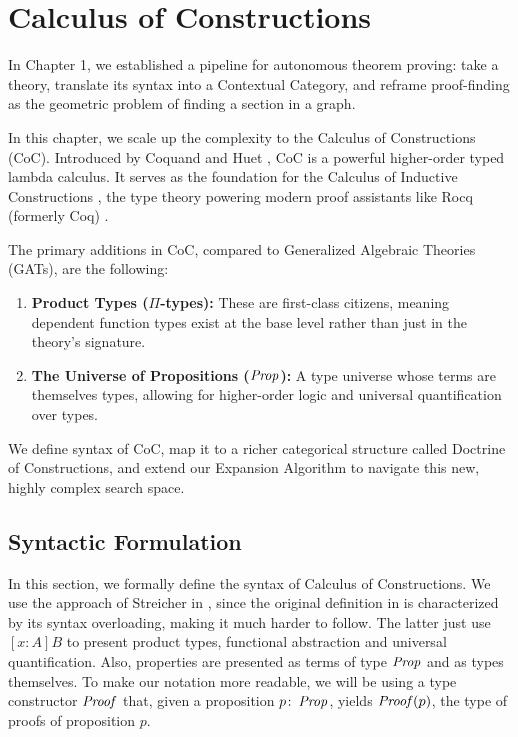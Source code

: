 \chapter{Calculus of Constructions}

In Chapter 1, we established a pipeline for autonomous theorem proving: 
take a theory, translate its syntax into a Contextual Category, and reframe proof-finding
as the geometric problem of finding a section in a graph.

In this chapter, we scale up the complexity to the Calculus of Constructions (CoC).
Introduced by Coquand and Huet \cite{coquand1988}, CoC is a powerful higher-order typed lambda calculus.
It serves as the foundation for the Calculus of Inductive Constructions \cite{coquand1990, paulin-mohring1993}, the type 
theory powering modern proof assistants like Rocq (formerly Coq) \cite{huet2000}.

The primary additions in CoC, compared to Generalized Algebraic Theories (GATs), are the following: 
\begin{enumerate}
    \item \textbf{Product Types (\boldmath$\Pi$-types):} These are first-class citizens,
        meaning dependent function types exist at the base level rather than just
        in the theory's signature.
    \item \textbf{The Universe of Propositions (\boldmath$\operatorname{\mathit{Prop}}$):} A type universe whose terms are themselves
        types, allowing for higher-order logic and universal quantification over types.
\end{enumerate}

We define syntax of CoC, map it to a richer categorical structure called
Doctrine of Constructions, and extend our Expansion Algorithm to navigate this new, 
highly complex search space.

\section{Syntactic Formulation}

In this section, we formally define the syntax of Calculus of Constructions.
We use the approach of Streicher in \cite{streicher}, since the original 
definition in \cite{coquand1988} is characterized by its syntax overloading, 
making it much harder to follow.
The latter just use $[x: A]B$ to present product types, functional abstraction and 
universal quantification. Also, properties are presented as terms of type $\operatorname{\mathit{Prop}}$
and as types themselves. To make our notation more readable, we will be using a type constructor
$\operatorname{\mathit{Proof}}$ that, given a proposition $p \colon \operatorname{\mathit{Prop}}$, yields $\operatorname{\mathit{Proof}}(p)$, the type of 
proofs of proposition $p$.

